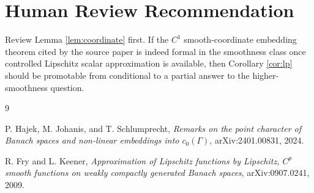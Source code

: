 \documentclass[11pt]{article}
\begin{document}
\section*{Human Review Recommendation}

Review Lemma \ref{lem:coordinate} first.  If the $C^1$ smooth-coordinate
embedding theorem cited by the source paper is indeed formal in the smoothness
class once controlled Lipschitz scalar approximation is available, then
Corollary \ref{cor:lp} should be promotable from conditional to a partial
answer to the higher-smoothness question.

\begin{thebibliography}{9}

P. Hajek, M. Johanis, and T. Schlumprecht,
\emph{Remarks on the point character of Banach spaces and non-linear
embeddings into $c_0(\Gamma)$},
arXiv:2401.00831, 2024.

R. Fry and L. Keener,
\emph{Approximation of Lipschitz functions by Lipschitz, $C^p$ smooth
functions on weakly compactly generated Banach spaces},
arXiv:0907.0241, 2009.

\end{thebibliography}
\end{document}
